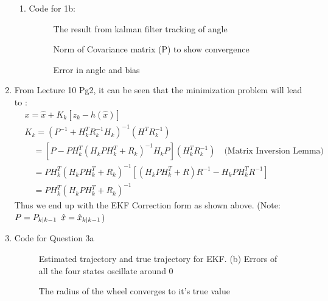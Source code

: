 \begin{enumerate}
\begin{enumerate}
\item Code for 1b:

\begin{figure}[h!]
  \centering
  \def\svgwidth{\columnwidth}
  
   \caption{The result from kalman filter tracking of angle}
   \label{fig1}
\end{figure}
\newpage
\begin{figure}[h!]
  \centering
  \def\svgwidth{\columnwidth}
  
   \caption{Norm of Covariance matrix (P) to show convergence}
   \label{fig2}
\end{figure}
\newpage
\begin{figure}[h!]
  \centering
  \def\svgwidth{\columnwidth}
  
   \caption{Error in angle and bias}
   \label{fig3}
\end{figure}
\end{enumerate}
\item From Lecture 10 Pg2, it can be seen that the minimization problem will lead to :
\begin{align*}
 &x = \hat x + K_k[z_k - h(\hat x)]\\
 &K_k = (P^{-1} + H_k^T R_k^{-1} H_k)^{-1} (H^T R_k^{-1})\\
 &\quad = [P - P H_k^T ( H_k P H_k^T  + R_k)^{-1}H_k P ] (H_k^T R_k^{-1}) \quad \mbox{(Matrix Inversion Lemma)}\\
 &\quad = PH_k^T (H_k P H_k^T + R_k)^{-1}[(H_kPH_k^T + R)R^{-1} - H_kPH_k^TR^{-1}] \\
 &\quad = PH_k^T (H_k P H_k^T + R_k)^{-1}
\end{align*}
Thus we end up with the EKF Correction form as shown above. (Note: $P = P_{k|k-1}\enskip \hat x = \hat x _{k|k-1}$)

\item Code for Question 3a   

\begin{figure}[h!]
  \centering
  \def\svgwidth{\columnwidth}
  
   \caption{Estimated trajectory and true trajectory for EKF. (b) Errors of all the four states oscillate around 0}
   \label{fig4}
\end{figure}
\begin{figure}[h!]
  \centering
  \def\svgwidth{\columnwidth}
  
   \caption{The radius of the wheel converges to it's true value}
   \label{fig6}
\end{figure}


\end{enumerate}
